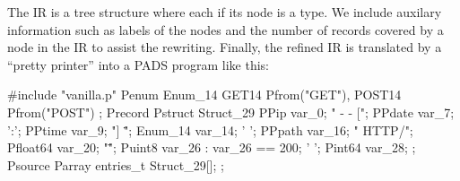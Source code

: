 \documentclass{article}
\begin{document}
The IR is a tree structure where each if its node is a type.
We include auxilary information such as labels of the nodes
and the number of records covered by a node in the IR to assist
the rewriting. Finally, the refined IR is translated
by a ``pretty printer'' into a PADS program like this:

{\small
\begin{code}
#include "vanilla.p"
Penum Enum_14 {
        GET14 Pfrom("GET"),
        POST14 Pfrom("POST")
};
Precord Pstruct Struct_29 {
        PPip var_0;
        " - - [";
        PPdate var_7;
        ':';
        PPtime var_9;
        "] \"";
        Enum_14 var_14;
        ' ';
        PPpath var_16;
        " HTTP/";
        Pfloat64 var_20;
        "\" ";
        Puint8 var_26 : var_26 == 200;
        ' ';
        Pint64 var_28;
};
Psource Parray entries_t {
        Struct_29[];
};
\end{code}
}



\end{document}
